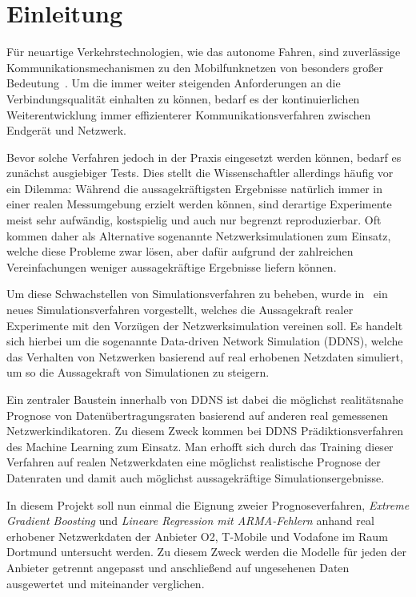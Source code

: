 \section{Einleitung}

F\"ur neuartige Verkehrstechnologien, wie das autonome Fahren, sind zuverl\"assige Kommunikationsmechanismen
zu den Mobilfunknetzen von besonders gro{\ss}er Bedeutung~\cite{IEEE}.
Um die immer weiter steigenden Anforderungen an die Verbindungsqualit\"at einhalten zu k\"onnen, bedarf es
der kontinuierlichen Weiterentwicklung immer effizienterer Kommunikationsverfahren zwischen Endger\"at und Netzwerk.

Bevor solche Verfahren jedoch in der Praxis eingesetzt werden k\"onnen, bedarf es zun\"achst ausgiebiger Tests.
Dies stellt die Wissenschaftler allerdings h\"aufig vor ein Dilemma: W\"ahrend die aussagekr\"aftigsten Ergebnisse nat\"urlich
immer in einer realen Messumgebung erzielt werden k\"onnen, sind derartige Experimente meist sehr aufw\"andig, kostspielig und
auch nur begrenzt reproduzierbar.
Oft kommen daher als Alternative sogenannte Netzwerksimulationen zum Einsatz, welche diese Probleme zwar l\"osen, aber daf\"ur
aufgrund der zahlreichen Vereinfachungen weniger aussagekr\"aftige Ergebnisse liefern k\"onnen.

Um diese Schwachstellen von Simulationsverfahren zu beheben, wurde in~\cite{IEEE} ein neues Simulationsverfahren vorgestellt,
welches die Aussagekraft realer Experimente
mit den Vorz\"ugen der Netzwerksimulation vereinen soll. Es handelt sich hierbei um die sogenannte Data-driven Network Simulation (DDNS),
welche das Verhalten von Netzwerken basierend auf real erhobenen Netzdaten simuliert, um so die Aussagekraft von Simulationen zu steigern.

Ein zentraler Baustein innerhalb von DDNS ist dabei die m\"oglichst realit\"atsnahe Prognose von Daten\"ubertragungsraten basierend
auf anderen real gemessenen Netzwerkindikatoren.
Zu diesem Zweck kommen bei DDNS Pr\"adiktionsverfahren des Machine Learning zum Einsatz.
Man erhofft sich durch das Training dieser Verfahren auf realen Netzwerkdaten eine m\"oglichst realistische Prognose der Datenraten und
damit auch m\"oglichst aussagekr\"aftige Simulationsergebnisse.

In diesem Projekt soll nun einmal die Eignung zweier Prognoseverfahren, \textit{Extreme Gradient Boosting} und
\textit{Lineare Regression mit ARMA-Fehlern} anhand real erhobener Netzwerkdaten der Anbieter O2, T-Mobile und Vodafone
im Raum Dortmund untersucht werden.
Zu diesem Zweck werden die Modelle f\"ur jeden der Anbieter getrennt angepasst und anschlie{\ss}end auf ungesehenen Daten
ausgewertet und miteinander verglichen.
